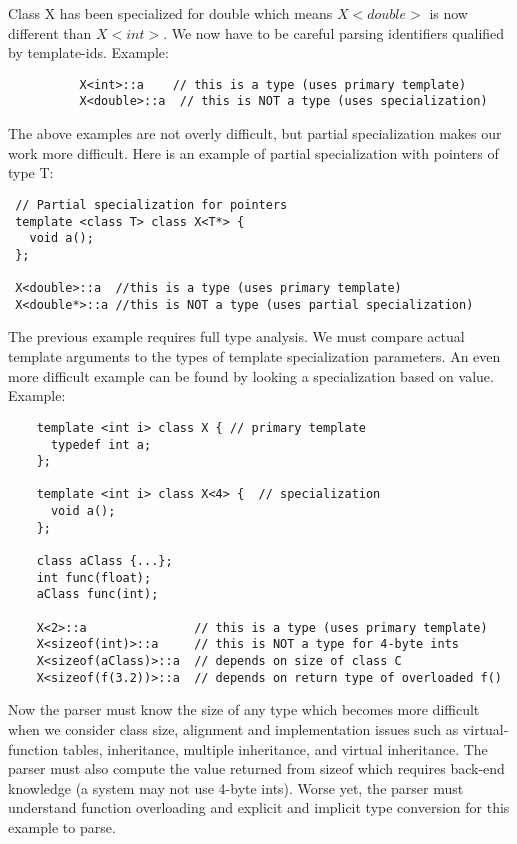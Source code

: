 Class X has been specialized for double which means $X<double>$ is now different than $X<int>$.  We now have to be careful parsing identifiers qualified by template-ids.  Example:

\singlespace
\begin{verbatim}
          X<int>::a    // this is a type (uses primary template)
          X<double>::a  // this is NOT a type (uses specialization)
\end{verbatim}
\doublespace

The above examples are not overly difficult, but partial specialization makes our work more difficult.  Here is an example of partial specialization with pointers of type T:

\singlespace
\begin{verbatim}
 // Partial specialization for pointers
 template <class T> class X<T*> {
   void a();
 };
 
 X<double>::a  //this is a type (uses primary template)
 X<double*>::a //this is NOT a type (uses partial specialization)
\end{verbatim}
\doublespace

The previous example requires full type analysis.  We must compare actual template arguments to the types of template specialization parameters.  An even more difficult example can be found by looking a specialization based on value.  Example:

\singlespace
\begin{verbatim}
    template <int i> class X { // primary template
      typedef int a;
    };

    template <int i> class X<4> {  // specialization
      void a();
    };

    class aClass {...};
    int func(float);
    aClass func(int);
          
    X<2>::a               // this is a type (uses primary template)
    X<sizeof(int)>::a     // this is NOT a type for 4-byte ints
    X<sizeof(aClass)>::a  // depends on size of class C
    X<sizeof(f(3.2))>::a  // depends on return type of overloaded f()
\end{verbatim}
\doublespace

Now the parser must know the size of any type which becomes more difficult when we consider class size, alignment and implementation issues such as virtual-function tables, inheritance, multiple inheritance, and virtual inheritance.  The parser must also compute the value returned from sizeof which requires back-end knowledge (a system may not use 4-byte ints).  Worse yet, the parser must understand function overloading and explicit and implicit type conversion for this example to parse.

